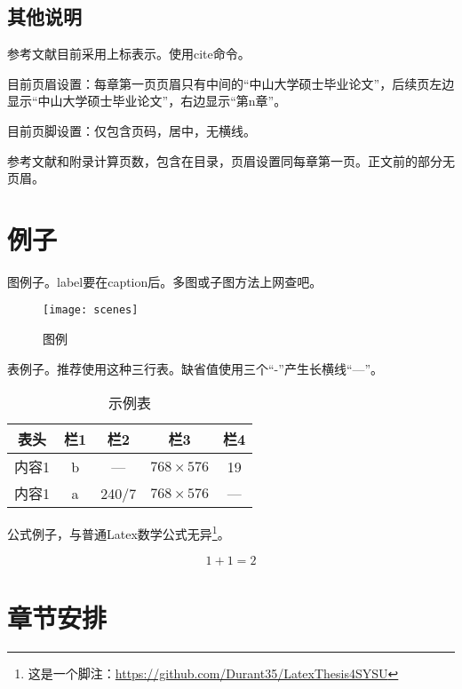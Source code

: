 \subsection{其他说明}
\label{sec:setting}

参考文献\cite{wu2013online}目前采用上标表示。使用cite命令。

目前页眉设置：每章第一页页眉只有中间的“中山大学硕士毕业论文”，后续页左边显示“中山大学硕士毕业论文”，右边显示“第n章”。

目前页脚设置：仅包含页码，居中，无横线。

参考文献和附录计算页数，包含在目录，页眉设置同每章第一页。正文前的部分无页眉。

\section{例子}
\label{sec:examples}

图例子。label要在caption后。多图或子图方法上网查吧。

\begin{figure}[!t]
	\centering
	\texttt{[image: scenes]}
	\caption{图例}
	\label{fig:scenes}
\end{figure}

表例子。推荐使用这种三行表。缺省值使用三个“-”产生长横线“---”。

\begin{table}[!t]
\caption{示例表}
\label{tab:eg}
\vspace{0.5em}
\centering
\wuhao
	\begin{tabular}{ccccc}
	\toprule[1.5pt]
	表头 & 栏1 & 栏2 & 栏3 & 栏4 \\
	\midrule[1pt]
	内容1 & b & --- & $768 \times 576$ & 19 \\
	内容1 & a & 240/7 & $768 \times 576$ & --- \\
	\bottomrule[1.5pt]
	\end{tabular}
\end{table}

公式例子，与普通Latex数学公式无异\footnote{这是一个脚注：\href{https://github.com/Durant35/LatexThesis4SYSU}{https://github.com/Durant35/LatexThesis4SYSU}}。

\begin{equation} \label{eq:Add}
1+1=2
\end{equation}

\section{章节安排}


\ifprint
	\newpage
	\thispagestyle{empty}
	\mbox{}
	
	\clearpage
	\setcounter{page}{10}
\fi